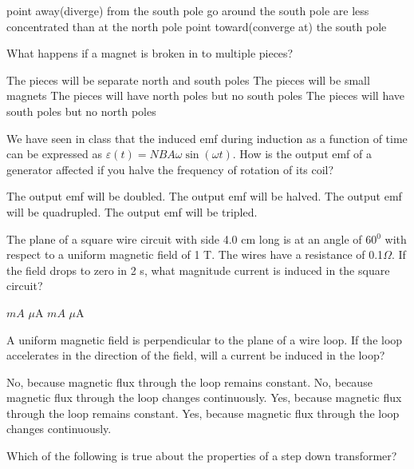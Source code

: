 \documentclass[12pt,addpoints]{exam}
\begin{document}
{{{\begin{questions}
\begin{choices}
						\choice point away(diverge) from the south pole
						\choice go around the south pole
						\choice are less concentrated than at the north pole
						\choice point toward(converge at) the south pole
					\end{choices}
					\question What happens if a magnet is broken in to  multiple pieces? 
					\begin{choices}
						\choice The pieces will be separate north and south poles
						\choice The pieces will be small magnets
						\choice The pieces will have north poles but no south poles
						\choice The pieces will have south poles but no north poles
					\end{choices}
					\question We have seen in class that the induced emf during induction as a function of time can be expressed as $\varepsilon(t)=NBA\omega\sin(\omega t)$. How is the output emf of a generator affected if you halve the frequency of rotation of its coil?
					\begin{choices}
					\choice The output emf will be doubled.
					\choice The output emf will be halved.
					\choice The output emf will be quadrupled.
					\choice The output emf will be tripled.
					\end{choices}
					\question The plane of a square wire circuit with side 4.0 cm long is at an angle of 60$^0$ with respect to a uniform magnetic field of 1 T. The wires have a resistance of 0.1$\Omega$. If the field drops to zero in 2 s, what magnitude current is induced in the square circuit? \\ \begin{oneparchoices}
					\choice 4 $mA$
					\choice 3 $\mu$A
					\choice 4 $mA$
					\choice 3 $\mu$A
					\end{oneparchoices}
					\question A uniform magnetic field is perpendicular to the plane of a wire loop. If the loop accelerates in the direction of the field, will a current be induced in the loop?
					\begin{choices}
					\choice No, because magnetic flux through the loop remains constant.
					\choice No, because magnetic flux through the loop changes continuously.
					\choice Yes, because magnetic flux through the loop remains constant.
					\choice Yes, because magnetic flux through the loop changes continuously.
					\end{choices}
					\question Which of the following is true about the properties of a step down transformer? \\
					\begin{choices}

\end{choices}
\end{questions}}}}
\end{document}
